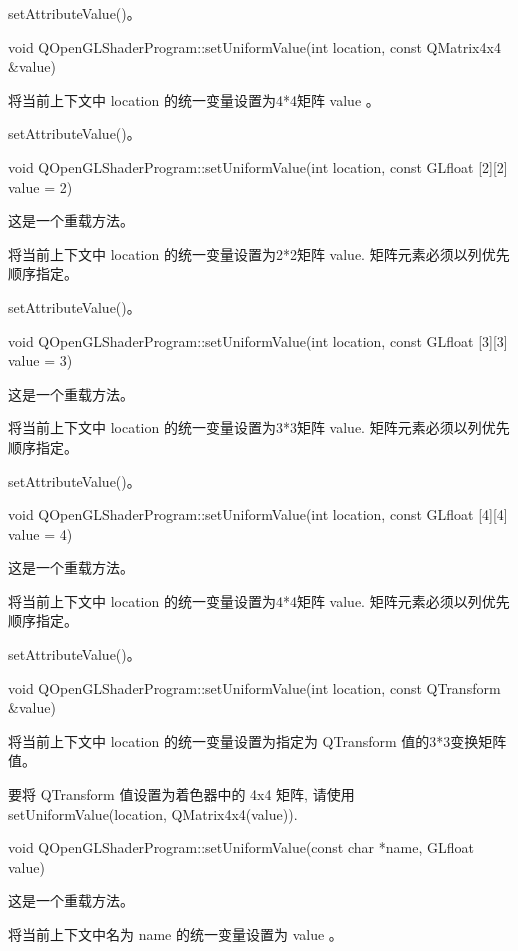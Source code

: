 \begin{seeAlso}
setAttributeValue()。
\end{seeAlso}

void QOpenGLShaderProgram::setUniformValue(int location, const QMatrix4x4 \&value)

将当前上下文中 location 的统一变量设置为4*4矩阵 value 。

\begin{seeAlso}
setAttributeValue()。
\end{seeAlso}

void QOpenGLShaderProgram::setUniformValue(int location, const GLfloat [2][2] value = 2)

这是一个重载方法。

将当前上下文中 location 的统一变量设置为2*2矩阵 value. 矩阵元素必须以列优先顺序指定。

\begin{seeAlso}
setAttributeValue()。
\end{seeAlso}

void QOpenGLShaderProgram::setUniformValue(int location, const GLfloat [3][3] value = 3)

这是一个重载方法。

将当前上下文中 location 的统一变量设置为3*3矩阵 value. 矩阵元素必须以列优先顺序指定。

\begin{seeAlso}
setAttributeValue()。
\end{seeAlso}

void QOpenGLShaderProgram::setUniformValue(int location, const GLfloat [4][4] value = 4)

这是一个重载方法。

将当前上下文中 location 的统一变量设置为4*4矩阵 value. 矩阵元素必须以列优先顺序指定。

\begin{seeAlso}
setAttributeValue()。
\end{seeAlso}

void QOpenGLShaderProgram::setUniformValue(int location, const QTransform \&value)

将当前上下文中 location 的统一变量设置为指定为 QTransform 值的3*3变换矩阵值。

要将 QTransform 值设置为着色器中的 4x4 矩阵, 请使用 setUniformValue(location, QMatrix4x4(value)).

void QOpenGLShaderProgram::setUniformValue(const char *name, GLfloat value)

这是一个重载方法。

将当前上下文中名为 name 的统一变量设置为 value 。

